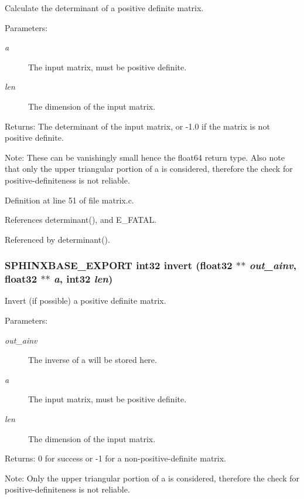 Calculate the determinant of a positive definite matrix. 

\begin{Desc}
\item[Parameters:]
\begin{description}
\item[{\em a}]The input matrix, must be positive definite. \item[{\em len}]The dimension of the input matrix. \end{description}
\end{Desc}
\begin{Desc}
\item[Returns:]The determinant of the input matrix, or -1.0 if the matrix is not positive definite.\end{Desc}
\begin{Desc}
\item[Note:]These can be vanishingly small hence the float64 return type. Also note that only the upper triangular portion of a is considered, therefore the check for positive-definiteness is not reliable. \end{Desc}


Definition at line 51 of file matrix.c.

References determinant(), and E\_\-FATAL.

Referenced by determinant().
\subsubsection[{invert}]{\setlength{\rightskip}{0pt plus 5cm}SPHINXBASE\_\-EXPORT int32 invert (float32 $\ast$$\ast$ {\em out\_\-ainv}, \/  float32 $\ast$$\ast$ {\em a}, \/  int32 {\em len})}\label{matrix_8h_a20f437dbe9fcd6f0adda31f181bfbea}


Invert (if possible) a positive definite matrix. 

\begin{Desc}
\item[Parameters:]
\begin{description}
\item[{\em out\_\-ainv}]The inverse of a will be stored here. \item[{\em a}]The input matrix, must be positive definite. \item[{\em len}]The dimension of the input matrix. \end{description}
\end{Desc}
\begin{Desc}
\item[Returns:]0 for success or -1 for a non-positive-definite matrix.\end{Desc}
\begin{Desc}
\item[Note:]Only the upper triangular portion of a is considered, therefore the check for positive-definiteness is not reliable. \end{Desc}


